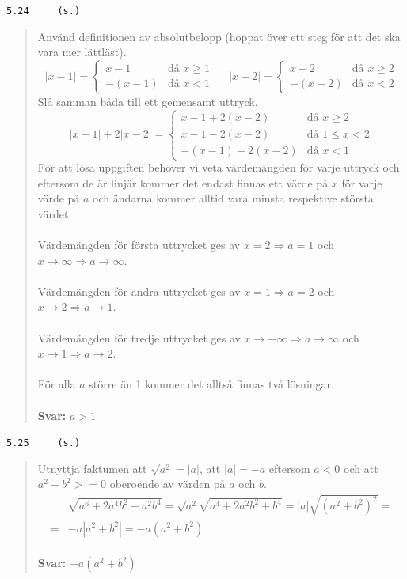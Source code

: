 \documentclass[a4paper]{article}
\newcommand{\tskcol}[1]{\textcolor{tskcol}{#1}}
\begin{document}
	\texttt{\tskcol{5.24~~~~ (s.)}}
	\begin{quotation}
		\noindent
		Använd definitionen av absolutbelopp (hoppat över ett steg för att det ska vara mer lättläst).
		\[|x-1|=
		\begin{cases}
		x-1&    \text{då } x \ge 1\\
		-(x-1)& \text{då } x < 1
		\end{cases}~~~~~~
		|x-2|=
		\begin{cases}
		x-2&    \text{då } x \ge 2\\
		-(x-2)& \text{då } x < 2
		\end{cases}\]
		Slå samman båda till ett gemensamt uttryck.
		\[|x-1|+2|x-2|=
		\begin{cases}
		x-1+2(x-2)&    \text{då } x \ge 2\\
		x-1-2(x-2)& \text{då } 1 \le x < 2 \\
		-(x-1)-2(x-2)& \text{då } x < 1 
		\end{cases}\]
		För att lösa uppgiften behöver vi veta värdemängden för varje uttryck och eftersom de är linjär kommer det endast finnas ett värde på $x$ för varje värde på $a$ och ändarna kommer alltid vara minsta respektive största värdet.
		\\ \\
		Värdemängden för första uttrycket ges av $x = 2 \Rightarrow a = 1$ och $x \rightarrow \infty \Rightarrow a \rightarrow \infty$.  
		\\ \\
		Värdemängden för andra uttrycket ges av $x = 1 \Rightarrow a = 2$ och $x \rightarrow 2 \Rightarrow a \rightarrow 1$.  
		\\ \\
		Värdemängden för tredje uttrycket ges av $x \rightarrow -\infty \Rightarrow a \rightarrow \infty$ och $x \rightarrow 1 \Rightarrow a \rightarrow 2$.  
		\\ \\
		För alla $a$ större än 1 kommer det alltså finnas två lösningar.
		\\ \\
		\textbf{Svar:} $a > 1$
	\end{quotation}
	
	\texttt{\tskcol{5.25~~~~ (s.)}}
	\begin{quotation}
		\noindent
		Utnyttja faktumen att $\sqrt{a^2}=|a|$, att $|a| = -a$ eftersom $a < 0$ och att $a^2+b^2 >= 0$ oberoende av värden på $a$ och $b$.
		\begin{align*}
		&\sqrt{a^6+2a^4b^2+a^2b^4}=
		\sqrt{a^2}\sqrt{a^4+2a^2b^2+b^4}=
		|a|\sqrt{(a^2+b^2)^2}= \\ =
		&-a|a^2+b^2|=
		-a(a^2+b^2)
		\end{align*}
		\\
		\textbf{Svar:} $-a(a^2+b^2)$
	\end{quotation}
	
\end{document}
